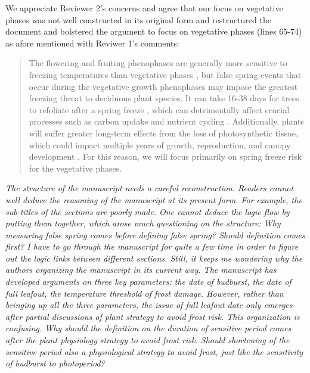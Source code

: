 \documentclass[11pt,a4paper]{article}
\begin{document}
We appreciate Reviewer 2's concerns and agree that our focus on vegetative phases was not well constructed in its original form and restructured the document and bolstered the argument to focus on vegetative phases (lines 65-74) as afore mentioned with Reviwer 1's comments: \\

\begin{quotation}
The flowering and fruiting phenophases are generally more sensitive to freezing temperatures than vegetative phases \citep{Inouye2000, Augspurger2009, Caradonna2016, Lenz2013}, but false spring events that occur during the vegetative growth phenophases may impose the greatest freezing threat to deciduous plant species. It can take 16-38 days for trees to refoliate after a spring freeze \citep{Gu2008, Augspurger2009, Augspurger2013, Menzel2015}, which can detrimentally affect crucial processes such as carbon updake and nutrient cycling \citep{Hufkens2012, Richardson2013, Klosterman2018}. Additionally, plants will suffer greater long-term effects from the loss of photosynthetic tissue, which could impact multiple years of growth, reproduction, and canopy development \citep{Vitasse2014, Xie2015}.  For this reason, we will focus primarily on spring freeze risk for the vegetative phases.
\end{quotation}


\textit{The structure of the manuscript needs a careful reconstruction. Readers cannot well deduce the reasoning of the manuscript at its present form. For example, the sub-titles of the sections are poorly made. One cannot deduce the logic flow by putting them together, which arose much questioning on the structure: Why measuring false spring comes before defining false spring? Should definition comes first? I have to go through the manuscript for quite a few time in order to figure out the logic links between different sections. Still, it keeps me wondering why the authors organizing the manuscript in its current way. The manuscript has developed arguments on three key parameters: the date of budburst, the date of full leafout, the temperature threshold of frost damage. However, rather than bringing up all the three parameters, the issue of full leafout date only emerges after partial discussions of plant strategy to avoid frost risk. This organization is confusing. Why should the definition on the duration of sensitive period comes after the plant physiology strategy to avoid frost risk. Should shortening of the sensitive period also a physiological strategy to avoid frost, just like the sensitivity of budburst to photoperiod? } \\
\end{document}
